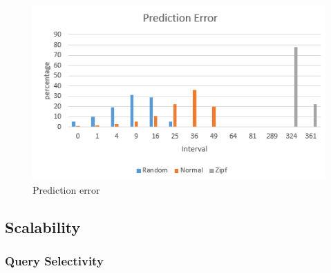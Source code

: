 \documentclass[sigconf,10pt]{acmart}
\begin{document}
\begin{figure}
  \includegraphics[scale=0.6]{../figures/addition/prediction-error}
  \caption{Prediction error}
  \label{prediction-error}
\end{figure}


\subsection{Scalability}

\subsubsection{Query Selectivity}
\end{document}
